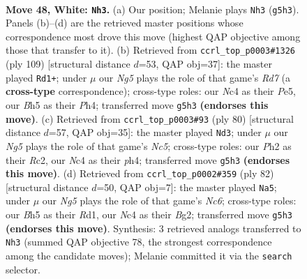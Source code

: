 \documentclass[11pt]{article}
\begin{document}
\clearpage

\begin{figure}[p]\centering
\begin{subfigure}{0.46\textwidth}\centering
\resizebox{\linewidth}{!}{%
\newchessgame
\chessboard[
  setfen={1nb5/rp2n1k1/4p3/5pNB/PpN2P2/1P4P1/5K1P/7R w - - 3 48},
  showmover=false,
  pgfstyle=straightmove, color=movearrow, markmove={g5-h3}
]}
\caption{}
\end{subfigure}\hfill
\begin{subfigure}{0.46\textwidth}\centering
\resizebox{\linewidth}{!}{%
\newchessgame
\chessboard[
  setfen={8/8/5pk1/3Pp1p1/2BnP2p/p1R2P1P/P2r4/5K2 b - - 1 55},
  showmover=false,
  pgfstyle=straightmove, color=movearrow, markmove={d2-d1}
]}
\caption{}
\end{subfigure}
\\[4pt]
\begin{subfigure}{0.46\textwidth}\centering
\resizebox{\linewidth}{!}{%
\newchessgame
\chessboard[
  setfen={r7/4nk2/p1b2p2/BpN3p1/7p/P4P1P/1PR2KP1/8 w - - 22 41},
  showmover=false,
  pgfstyle=straightmove, color=movearrow, markmove={c5-d3}
]}
\caption{}
\end{subfigure}\hfill
\begin{subfigure}{0.46\textwidth}\centering
\resizebox{\linewidth}{!}{%
\newchessgame
\chessboard[
  setfen={6k1/2r2p2/p1N3p1/2n4p/Pp5P/1Pb3P1/5PB1/3R2K1 w - - 4 42},
  showmover=false,
  pgfstyle=straightmove, color=movearrow, markmove={c6-a5}
]}
\caption{}
\end{subfigure}
\caption{\textbf{Move 48, White: \texttt{Nh3}.} (a) Our position; Melanie plays \texttt{Nh3} (\texttt{g5h3}). Panels (b)--(d) are the retrieved master positions whose correspondence most drove this move (highest QAP objective among those that transfer to it). (b) Retrieved from \texttt{ccrl\_top\_p0003\#1326} (ply 109) [structural distance $d$=53, QAP obj=37]: the master played \texttt{Rd1+}; under $\mu$ our \emph{Ng5} plays the role of that game's \emph{Rd7} (a \textbf{cross-type} correspondence); cross-type roles: our \emph{N}c4 as their \emph{P}e5, our \emph{B}h5 as their \emph{P}h4; transferred move \texttt{g5h3} \textbf{(endorses this move)}. (c) Retrieved from \texttt{ccrl\_top\_p0003\#93} (ply 80) [structural distance $d$=57, QAP obj=35]: the master played \texttt{Nd3}; under $\mu$ our \emph{Ng5} plays the role of that game's \emph{Nc5}; cross-type roles: our \emph{P}h2 as their \emph{R}c2, our \emph{N}c4 as their \emph{p}h4; transferred move \texttt{g5h3} \textbf{(endorses this move)}. (d) Retrieved from \texttt{ccrl\_top\_p0002\#359} (ply 82) [structural distance $d$=50, QAP obj=7]: the master played \texttt{Na5}; under $\mu$ our \emph{Ng5} plays the role of that game's \emph{Nc6}; cross-type roles: our \emph{B}h5 as their \emph{R}d1, our \emph{N}c4 as their \emph{B}g2; transferred move \texttt{g5h3} \textbf{(endorses this move)}. Synthesis: 3 retrieved analogs transferred to \texttt{Nh3} (summed QAP objective 78, the strongest correspondence among the candidate moves); Melanie committed it via the \texttt{search} selector.}
\label{fig:thought-m94}
\end{figure}
\end{document}
